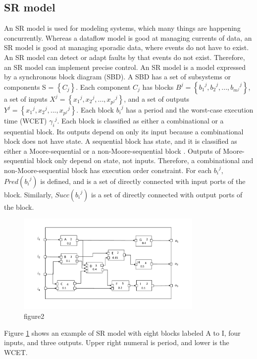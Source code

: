 \documentclass[conference,compsoc]{IEEEtran}
\begin{document}
\subsection{SR model}
An SR model is used for modeling systems, which many things are happening concurrently.
Whereas a dataflow model is good at managing currents of data, an SR model is good at managing sporadic data, where events do not have to exist.
An SR model can detect or adapt faults by that events do not exist.
Therefore, an SR model can implement precise control.
An SR model is a model expressed by a synchronous block diagram (SBD).
A SBD has a set of subsystems or components S = $\left\{C_j\right\}$. 
Each component $C_j$ has blocks $B^j = \left\{{{b_1}^j, {b_2}^j,...,{b_{m^j}}^j}\right\}$, a set of inputs $X^j = \left\{{x_1}^j,{x_2}^j,...,{x_{p^j}}^j\right\}$,
and a set of outputs $Y^j = \left\{{x_1}^j,{x_2}^j,...,{x_{p^j}}^j\right\}$.
Each block ${b_i}^j$ has a period and the worst-case execution time (WCET) ${\gamma_i}^j$.
Each block is classified as either a combinational or a sequential block.
Its outputs depend on only its input because a combinational block does not have state.
A sequential block has state, and it is classified as either a Moore-sequential or a non-Moore-sequential block \cite{Lublinerman:2009:MCG:1480881.1480893}.
Outputs of Moore-sequential block only depend on state, not inputs.
Therefore, a combinational and  non-Moore-sequential block has execution order constraint.
For each ${b_i}^j$, $Pred({b_i}^j)$ is defined, and is a set of directly connected with input ports of the block.
Similarly, $Succ({b_i}^j)$ is a set of directly connected with output ports of the block.
\begin{figure}
	\centering
	\includegraphics[width=9cm,clip]{figure5.pdf}
	\caption{figure2}
	\label{fig2}
\end{figure}

Figure \ref{fig2} shows an example of SR model with eight blocks labeled A to I, four inputs, and three outputs.
Upper right numeral is period, and lower is the WCET.
\end{document}
